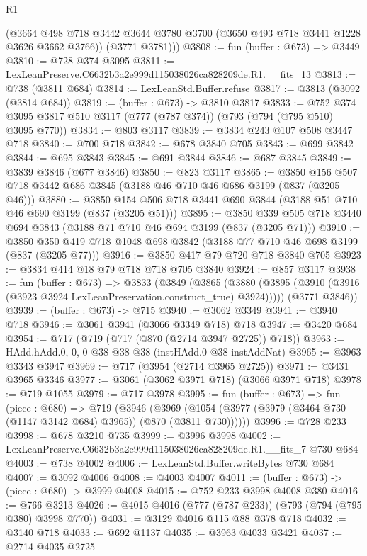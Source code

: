 \begin{lexlean}{R1}
\begin{coremodule}
        (@3664 @498 @718 @3442 @3644 @3780 @3700 (@3650 @493 @718 @3441 @1228 @3626 @3662 @3766))
        (@3771 @3781)))
@3808 := fun (buffer : @673) => @3449
@3810 := @728 @374 @3095
@3811 := LexLeanPreserve.C6632b3a2e999d115038026ca828209de.R1.__fits_13
@3813 := @738 (@3811 @684)
@3814 := LexLeanStd.Buffer.refuse
@3817 := @3813 (@3092 (@3814 @684))
@3819 := (buffer : @673) -> @3810 @3817
@3833 := @752 @374 @3095 @3817 @510 @3117 (@777 (@787 @374)) (@793 (@794 (@795 @510) @3095 @770))
@3834 := @803 @3117
@3839 := @3834 @243 @107 @508 @3447 @718
@3840 := @700 @718
@3842 := @678 @3840 @705
@3843 := @699 @3842
@3844 := @695 @3843
@3845 := @691 @3844
@3846 := @687 @3845
@3849 := @3839 @3846 (@677 @3846)
@3850 := @823 @3117
@3865 := @3850 @156 @507 @718 @3442 @686 @3845 (@3188 @46 @710 @46 @686 @3199 (@837 (@3205 @46)))
@3880 := @3850 @154 @506 @718 @3441 @690 @3844 (@3188 @51 @710 @46 @690 @3199 (@837 (@3205 @51)))
@3895 := @3850 @339 @505 @718 @3440 @694 @3843 (@3188 @71 @710 @46 @694 @3199 (@837 (@3205 @71)))
@3910 := @3850 @350 @419 @718 @1048 @698 @3842 (@3188 @77 @710 @46 @698 @3199 (@837 (@3205 @77)))
@3916 := @3850 @417 @79 @720 @718 @3840 @705
@3923 := @3834 @414 @18 @79 @718 @718 @705 @3840
@3924 := @857 @3117
@3938 := fun (buffer : @673) =>
  @3833
    (@3849
      (@3865 (@3880 (@3895 (@3910 (@3916 (@3923 @3924 LexLeanPreservation.construct_true) @3924)))))
      (@3771 @3846))
@3939 := (buffer : @673) -> @715
@3940 := @3062 @3349
@3941 := @3940 @718
@3946 := @3061 @3941 (@3066 @3349 @718) @718
@3947 := @3420 @684
@3954 := @717 (@719 (@717 (@870 (@2714 @3947 @2725)) @718))
@3963 := HAdd.hAdd.{0, 0, 0} @38 @38 @38 (instHAdd.{0} @38 instAddNat)
@3965 := @3963 @3343 @3947
@3969 := @717 (@3954 (@2714 @3965 @2725))
@3971 := @3431 @3965 @3346
@3977 := @3061 (@3062 @3971 @718) (@3066 @3971 @718)
@3978 := @719 @1055
@3979 := @717 @3978
@3995 := fun (buffer : @673) =>
  fun (piece : @680) =>
  @719
    (@3946
      (@3969 (@1054 (@3977 (@3979 (@3464 @730 (@1147 @3142 @684) @3965)) (@870 (@3811 @730))))))
@3996 := @728 @233
@3998 := @678 @3210 @735
@3999 := @3996 @3998
@4002 := LexLeanPreserve.C6632b3a2e999d115038026ca828209de.R1.__fits_7 @730 @684
@4003 := @738 @4002
@4006 := LexLeanStd.Buffer.writeBytes @730 @684
@4007 := @3092 @4006
@4008 := @4003 @4007
@4011 := (buffer : @673) -> (piece : @680) -> @3999 @4008
@4015 := @752 @233 @3998 @4008 @380
@4016 := @766 @3213
@4026 := @4015 @4016 (@777 (@787 @233)) (@793 (@794 (@795 @380) @3998 @770))
@4031 := @3129 @4016 @115 @88 @378 @718
@4032 := @3140 @718
@4033 := @692 @1137
@4035 := @3963 @4033 @3421
@4037 := @2714 @4035 @2725

\end{coremodule}
\end{lexlean}
